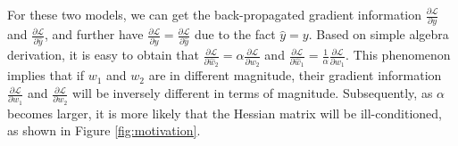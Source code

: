 \documentclass[twocolumn]{article}
\begin{document}
For these two models, we can get the back-propagated gradient information $\frac{\partial \mathcal{L} }{\partial y}$ and $\frac{\partial \mathcal{L} }{\partial \hat{y}}$, and further have $\frac{\partial \mathcal{L} }{\partial y}=\frac{\partial \mathcal{L} }{\partial \hat{y}}$ due to the fact $\hat{y}=y$. Based on simple algebra derivation, it is easy to obtain that $\frac{\partial \mathcal{L} }{\partial \hat{w}_2} = \alpha \frac{\partial \mathcal{L} }{\partial w_2}$ and $\frac{\partial \mathcal{L} }{\partial \hat{w}_1} =\frac{1} {\alpha} \frac{\partial \mathcal{L} }{\partial w_1}$. This phenomenon implies that if $w_1$ and $w_2$ are in different magnitude, their gradient information $\frac{\partial \mathcal{L} }{\partial w_1}$ and $\frac{\partial \mathcal{L} }{\partial w_2}$ will be inversely different in terms of magnitude. Subsequently, as $\alpha$ becomes larger, it is more likely that the Hessian matrix will be ill-conditioned, as shown in Figure \ref{fig:motivation}.

\begin{figure*}[t]
\centering
\hspace{-0.02\linewidth}
  \caption{\small An illustrative example of scaling-based weight space symmetry that can cause ill-conditioned problem. (a) the error landscape of $w_1$ and $w_2$ in the same magnitude; (b) the  error landscape of $\hat{w}_1$ and $\hat{w}_2$ by scaling a factor $\alpha$ and $\frac{1}{\alpha}$ respectively in different magnitudes.}
  \label{fig:motivation}
\end{figure*}
\end{document}
